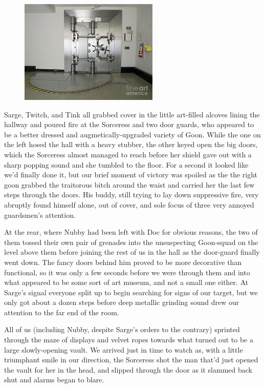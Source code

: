 \begin{figure}
	\begin{center}
		\includegraphics[width=\figwidth]{pics/18/62.png}
	\end{center}
\end{figure}
Sarge, Twitch, and Tink all grabbed cover in the little art-filled alcoves lining the hallway and poured fire at the Sorceress and two door guards, who appeared to be a better dressed and augmetically-upgraded variety of Goon. 
While the one on the left hosed the hall with a heavy stubber, the other keyed open the big doors, which the Sorceress almost managed to reach before her shield gave out with a sharp popping sound and she tumbled to the floor. 
For a second it looked like we'd finally done it, but our brief moment of victory was spoiled as the the right goon grabbed the traitorous bitch around the waist and carried her the last few steps through the doors. 
His buddy, still trying to lay down suppressive fire, very abruptly found himself alone, out of cover, and sole focus of three very annoyed guardsmen's attention.

At the rear, where Nubby had been left with Doc for obvious reasons, the two of them tossed their own pair of grenades into the unsuspecting Goon-squad on the level above them before joining the rest of us in the hall as the door-guard finally went down. 
The fancy doors behind him proved to be more decorative than functional, so it was only a few seconds before we were through them and into what appeared to be some sort of art museum, and not a small one either. 
At Sarge's signal everyone split up to begin searching for signs of our target, but we only got about a dozen steps before deep metallic grinding sound drew our attention to the far end of the room. 


All of us (including Nubby, despite Sarge's orders to the contrary) sprinted through the maze of displays and velvet ropes towards what turned out to be a large slowly-opening vault. 
We arrived just in time to watch as, with a little triumphant smile in our direction, the Sorceress shot the man that'd just opened the vault for her in the head, and slipped through the door as it slammed back shut and alarms began to blare.

